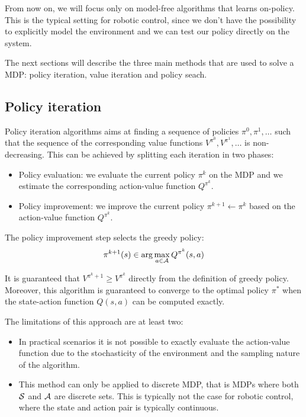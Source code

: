 From now on, we will focus only on model-free algorithms that learns on-policy. This is the typical setting for robotic control, since we don't have the possibility to explicitly model the environment and we can test our policy directly on the system.

The next sections will describe the three main methods that are used to solve a MDP: policy iteration, value iteration and policy seach.

\subsection{Policy iteration}
Policy iteration algorithms aims at finding a sequence of policies $\pi^0, \pi^1, \ldots$ such that the sequence of the corresponding value functions $V^{\pi^0}, V^{\pi^1}, \ldots$ is non-decreasing. 
This can be achieved by splitting each iteration in two phases:
\begin{itemize}
\item Policy evaluation: we evaluate the current policy $\pi^k$ on the MDP and we estimate the corresponding action-value function $Q^{\pi^k}$.
\item Policy improvement: we improve the current policy $\pi^{k+1} \gets \pi^{k}$ based on the action-value function $Q^{\pi^k}$.
\end{itemize}

The policy improvement step selects the greedy policy:
\begin{equation}
\pi^{k+1}(s) \in \arg \max_{a \in \mathcal{A}} Q^{\pi^k}(s, a)  
\end{equation}

It is guaranteed that $V^{\pi^k+1} \geq V^{\pi^k}$ directly from the definition of greedy policy. Moreover, this algorithm is guaranteed to converge to the optimal policy $\pi^*$ when the state-action function $Q(s,a)$ can be computed exactly.

The limitations of this approach are at least two:
\begin{itemize}
\item In practical scenarios it is not possible to exactly evaluate the action-value function due to the stochasticity of the environment and the sampling nature of the algorithm.
\item This method can only be applied to discrete MDP, that is MDPs where both $\mathcal{S}$ and $\mathcal{A}$ are discrete sets. This is typically not the case for robotic control, where the state and action pair is typically continuous.
\end{itemize}


